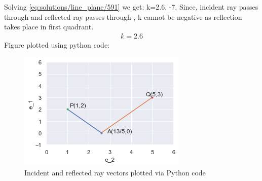 Solving \eqref{eq:solutions/line_plane/591} we get:
 k=2.6, -7.
 Since, incident ray passes through  and reflected ray passes through ,
 k cannot be negative as reflection takes place in first quadrant.
\begin{align}
   k=2.6
\end{align}
Figure plotted using python code:
\begin{figure}[h]
\centering
\includegraphics[width=\columnwidth]{./solutions/line_plane/59/output.png}
\caption{Incident and reflected ray vectors plotted via Python code}
\label{fig:solutions/line_plane/591}
\end{figure}
